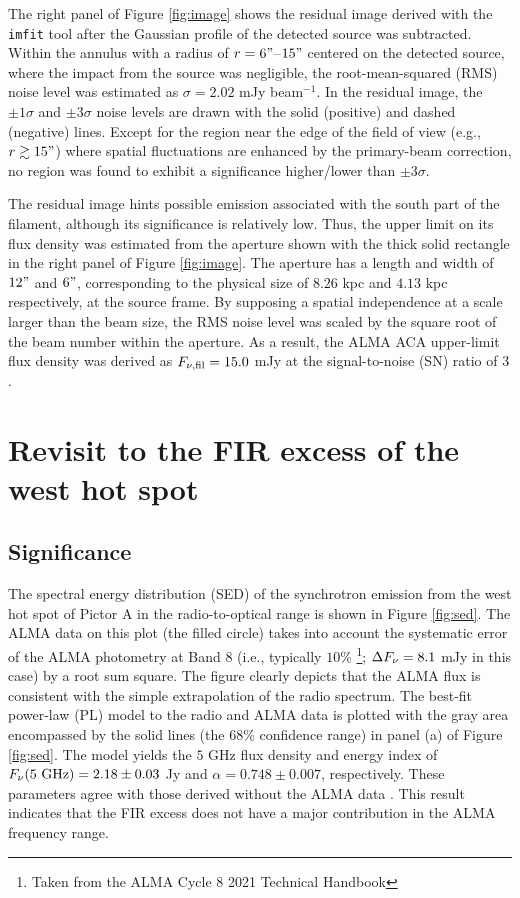 \documentclass[twocolumn]{aastex631}
\begin{document}
The right panel of Figure \ref{fig:image} shows 
the residual image derived with the {\tt imfit} tool
after the Gaussian profile of the detected source was subtracted. 
Within the annulus with a radius of $r=6"$--$15"$ centered 
on the detected source, 
where the impact from the source was negligible, 
the root-mean-squared (RMS) noise level was 
estimated as $\sigma = 2.02$ mJy beam$^{-1}$.
In the residual image, 
the $\pm 1 \sigma$ and $\pm 3 \sigma$ noise levels 
are drawn with the solid (positive) and dashed (negative) lines. 
Except for the region near the edge of the field of view 
(e.g., $r \gtrsim 15"$) 
where spatial fluctuations are enhanced by the primary-beam correction, 
no region was found to exhibit 
a significance higher/lower than $\pm 3 \sigma$.

The residual image hints possible emission 
associated with the south part of the filament,
although its significance is relatively low. 
Thus, the upper limit on its flux density 
was estimated from the aperture shown with the thick solid rectangle 
in the right panel of Figure \ref{fig:image}.
The aperture has a length and width of $12"$ and $6"$,
corresponding to the physical size of $8.26$ kpc and $4.13$ kpc 
respectively, at the source frame.
By supposing a spatial independence at a scale larger than the beam size,
the RMS noise level was scaled by the square root of the beam number 
within the aperture. 
As a result, the ALMA ACA upper-limit flux density was derived 
as $F_{\nu,{\rm fil}} = 15.0$ mJy 
at the signal-to-noise (SN) ratio of $3$.



\section{Revisit to the FIR excess of the west hot spot} 
\label{sec:FIRexcess}
\subsection{Significance}
\label{sec:significance}
The spectral energy distribution (SED) of the synchrotron emission 
from the west hot spot of Pictor A
in the radio-to-optical range is shown in Figure \ref{fig:sed}.
The ALMA data on this plot (the filled circle) takes into account 
the systematic error of the ALMA photometry at Band 8 
(i.e., typically $10$\%
\footnote{Taken from the ALMA Cycle 8 2021 Technical Handbook}; 
$\Delta F_{\rm \nu} = 8.1$ mJy in this case)
by a root sum square.
The figure clearly depicts that 
the ALMA flux is consistent with the simple extrapolation of the radio spectrum.
The best-fit power-law (PL) model to the radio and ALMA data
is plotted with the gray area 
encompassed by the solid lines (the $68$\% confidence range)
in panel (a) of Figure \ref{fig:sed}.
The model yields the $5$ GHz flux density and energy index of 
$F_{\nu}(\rm{5~GHz}) = 2.18 \pm 0.03$ Jy 
and $\alpha = 0.748 \pm 0.007$, respectively.
These parameters agree 
with those derived without the ALMA data \citep{meisenheimer1997}.
This result indicates that the FIR excess 
does not have a major contribution 
in the ALMA frequency range.
\end{document}
